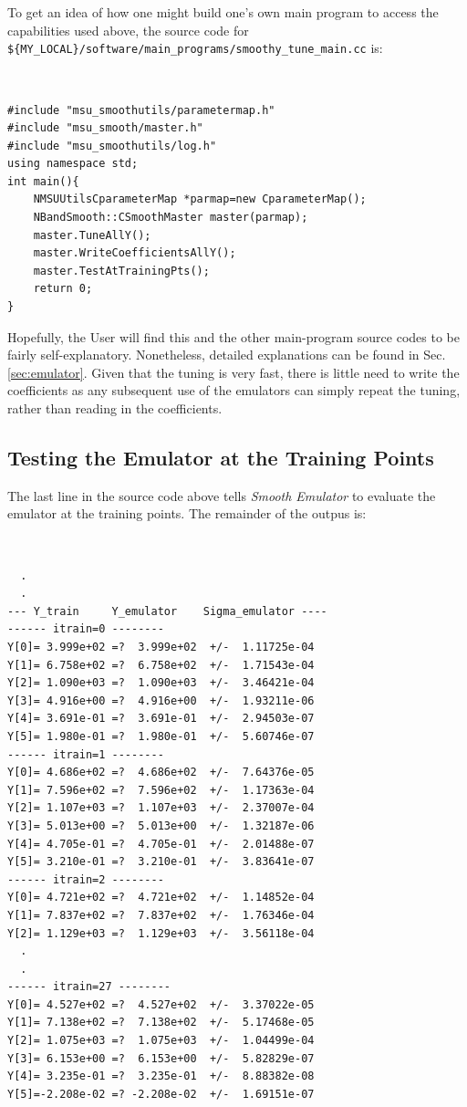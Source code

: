 \documentclass[UserManual.tex]{subfiles}
\begin{document}
To get an idea of how one might build one's own main program to access the capabilities used above, the source code for {\tt \$\{MY\_LOCAL\}/software/main\_programs/smoothy\_tune\_main.cc} is:
{\tt
\begin{verbatim}
#include "msu_smoothutils/parametermap.h"
#include "msu_smooth/master.h"
#include "msu_smoothutils/log.h"
using namespace std;
int main(){
	NMSUUtilsCparameterMap *parmap=new CparameterMap();
	NBandSmooth::CSmoothMaster master(parmap);	
	master.TuneAllY();
	master.WriteCoefficientsAllY();
	master.TestAtTrainingPts();
	return 0;
}
\end{verbatim}}
Hopefully, the User will find this and the other main-program source codes to be fairly self-explanatory. Nonetheless, detailed explanations can be found in Sec. \ref{sec:emulator}. Given that the tuning is very fast, there is little need to write the coefficients as any subsequent use of the emulators can simply repeat the tuning, rather than reading in the coefficients.

\subsection{Testing the Emulator at the Training Points}
The last line in the source code above tells {\it Smooth Emulator} to evaluate the emulator at the training points. The remainder of the outpus is:
{\tt
\begin{verbatim}
  .
  .
--- Y_train     Y_emulator    Sigma_emulator ----
------ itrain=0 --------
Y[0]= 3.999e+02 =?  3.999e+02  +/-  1.11725e-04
Y[1]= 6.758e+02 =?  6.758e+02  +/-  1.71543e-04
Y[2]= 1.090e+03 =?  1.090e+03  +/-  3.46421e-04
Y[3]= 4.916e+00 =?  4.916e+00  +/-  1.93211e-06
Y[4]= 3.691e-01 =?  3.691e-01  +/-  2.94503e-07
Y[5]= 1.980e-01 =?  1.980e-01  +/-  5.60746e-07
------ itrain=1 --------
Y[0]= 4.686e+02 =?  4.686e+02  +/-  7.64376e-05
Y[1]= 7.596e+02 =?  7.596e+02  +/-  1.17363e-04
Y[2]= 1.107e+03 =?  1.107e+03  +/-  2.37007e-04
Y[3]= 5.013e+00 =?  5.013e+00  +/-  1.32187e-06
Y[4]= 4.705e-01 =?  4.705e-01  +/-  2.01488e-07
Y[5]= 3.210e-01 =?  3.210e-01  +/-  3.83641e-07
------ itrain=2 --------
Y[0]= 4.721e+02 =?  4.721e+02  +/-  1.14852e-04
Y[1]= 7.837e+02 =?  7.837e+02  +/-  1.76346e-04
Y[2]= 1.129e+03 =?  1.129e+03  +/-  3.56118e-04
  .
  .
------ itrain=27 --------
Y[0]= 4.527e+02 =?  4.527e+02  +/-  3.37022e-05
Y[1]= 7.138e+02 =?  7.138e+02  +/-  5.17468e-05
Y[2]= 1.075e+03 =?  1.075e+03  +/-  1.04499e-04
Y[3]= 6.153e+00 =?  6.153e+00  +/-  5.82829e-07
Y[4]= 3.235e-01 =?  3.235e-01  +/-  8.88382e-08
Y[5]=-2.208e-02 =? -2.208e-02  +/-  1.69151e-07
\end{verbatim}}
\end{document}
